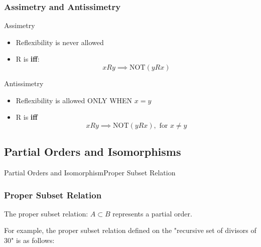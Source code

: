 \begin{frame}
  \frametitle{Assimetry and Antissimetry}

  {\larger

    \begin{block}{Assimetry}
      \begin{itemize}
      \item Reflexibility is \alert{never} allowed
      \item R is  {\bf iff}:
        \begin{equation*}
          xRy \implies \text{NOT}(yRx)
        \end{equation*}
      \end{itemize}

    \end{block}

    \begin{block}{Antissimetry}
      \begin{itemize}
      \item Reflexibility is allowed \alert{ONLY WHEN $x = y$}
      \item R is  {\bf iff}
        \begin{equation*}
          xRy \implies \text{NOT}(yRx), \text{ for } x \neq y
        \end{equation*}
      \end{itemize}
    \end{block}
  }
\end{frame}


\subsection{Partial Orders and Isomorphisms}

\begin{frame}{Partial Orders and Isomorphism}{Proper Subset Relation}
  \frametitle{Proper Subset Relation}

  The proper subset relation: $A \subset B$ represents a partial order.\bigskip

  For example, the proper subset relation defined on the "recursive set of divisors of 30" is as follows:

\begin{center}
  \end{center}
\end{frame}

